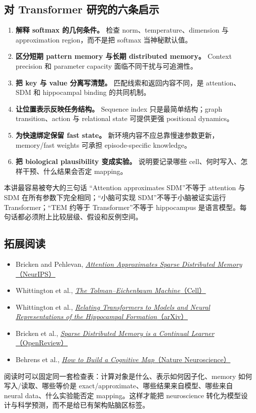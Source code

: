 \subsection{对 Transformer 研究的六条启示}

\begin{enumerate}
  \item \textbf{解释 softmax 的几何条件。} 检查 norm、temperature、dimension 与 approximation region，而不是把 softmax 当神秘默认值。
  \item \textbf{区分短期 pattern memory 与长期 distributed memory。} Context precision 和 parameter capacity 面临不同干扰与可追溯性。
  \item \textbf{把 key 与 value 分离写清楚。} 匹配线索和返回内容不同，是 attention、SDM 和 hippocampal binding 的共同机制。
  \item \textbf{让位置表示反映任务结构。} Sequence index 只是最简单结构；graph transition、action 与 relational state 可提供更强 positional dynamics。
  \item \textbf{为快速绑定保留 fast state。} 新环境内容不应总靠慢速参数更新，memory/fast weights 可承担 episode-specific knowledge。
  \item \textbf{把 biological plausibility 变成实验。} 说明要记录哪些 cell、何时写入、怎样干预、什么结果会否定 mapping。
\end{enumerate}

\begin{warningbox}{本讲最容易被夸大的三句话}
“Attention approximates SDM”不等于 attention 与 SDM 在所有参数下完全相同；“小脑可实现 SDM”不等于小脑被证实运行 Transformer；“TEM 约等于 Transformer”不等于 hippocampus 是语言模型。每句话都必须附上比较层级、假设和反例空间。
\end{warningbox}

\subsection{拓展阅读}

\begin{itemize}
  \item Bricken and Pehlevan, \href{https://proceedings.neurips.cc/paper/2021/hash/8171ac2c5544a5cb54ac0f38bf477af4-Abstract.html}{\emph{Attention Approximates Sparse Distributed Memory}（NeurIPS）}
  \item Whittington et al., \href{https://www.sciencedirect.com/science/article/pii/S009286742031388X}{\emph{The Tolman--Eichenbaum Machine}（Cell）}
  \item Whittington et al., \href{https://arxiv.org/abs/2112.04035}{\emph{Relating Transformers to Models and Neural Representations of the Hippocampal Formation}（arXiv）}
  \item Bricken et al., \href{https://openreview.net/forum?id=JknGeelZJpHP}{\emph{Sparse Distributed Memory is a Continual Learner}（OpenReview）}
  \item Behrens et al., \href{https://www.nature.com/articles/s41593-022-01153-y}{\emph{How to Build a Cognitive Map}（Nature Neuroscience）}
\end{itemize}

阅读时可以固定同一套检查表：计算对象是什么、表示如何因子化、memory 如何写入/读取、哪些等价是 exact/approximate、哪些结果来自模型、哪些来自 neural data、什么实验能否定 mapping。这样才能把 neuroscience 转化为模型设计与科学预测，而不是给已有架构贴脑区标签。


